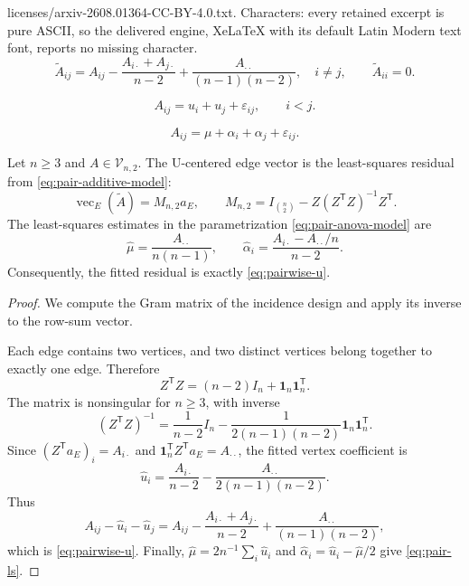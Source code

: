 \documentclass[10pt,a4paper]{amsart}
\newcommand{\cV}{\mathcal V}
\newcommand{\one}{\mathbf 1}
\begin{document}
licenses/arxiv-2608.01364-CC-BY-4.0.txt. Characters: every retained excerpt is pure ASCII, so the delivered engine, XeLaTeX with its default Latin Modern text font, reports no missing character.
\begin{equation}\label{eq:pairwise-u}
 \widetilde A_{ij}
 =A_{ij}-\frac{A_{i\cdot}+A_{j\cdot}}{n-2}
       +\frac{A_{\cdot\cdot}}{(n-1)(n-2)},
 \quad i\ne j,
 \qquad
 \widetilde A_{ii}=0.
\end{equation}

\begin{equation}\label{eq:pair-additive-model}
  A_{ij}=u_i+u_j+\varepsilon_{ij},\qquad i<j.
\end{equation}

\begin{equation}\label{eq:pair-anova-model}
  A_{ij}=\mu+\alpha_i+\alpha_j+\varepsilon_{ij}.
\end{equation}

\begin{theorem}
\label{thm:pair-anova}
Let $n\ge3$ and $A\in\cV_{n,2}$.  The U-centered edge vector is the
least-squares residual from \eqref{eq:pair-additive-model}:
\begin{equation}\label{eq:pair-projection}
  \operatorname{vec}_{E}(\widetilde A)
  =M_{n,2}a_E,
  \qquad
  M_{n,2}=I_{\binom{n}{2}}-Z(Z^\mathsf TZ)^{-1}Z^\mathsf T.
\end{equation}
The least-squares estimates in the parametrization
\eqref{eq:pair-anova-model} are
\begin{equation}\label{eq:pair-ls}
 \widehat\mu=\frac{A_{\cdot\cdot}}{n(n-1)},
 \qquad
 \widehat\alpha_i
 =\frac{A_{i\cdot}-A_{\cdot\cdot}/n}{n-2}.
\end{equation}
Consequently, the fitted residual is exactly \eqref{eq:pairwise-u}.
\end{theorem}

\begin{proof}
We compute the Gram matrix of the incidence design and apply its inverse to
the row-sum vector.

Each edge contains two vertices, and two distinct vertices belong together to
exactly one edge.  Therefore
  \begin{equation*}
 Z^\mathsf TZ=(n-2)I_n+\one_n\one_n^\mathsf T.
\end{equation*}
The matrix is nonsingular for $n\ge3$, with inverse
\begin{equation}\label{eq:ztz-inverse}
 (Z^\mathsf TZ)^{-1}
 =\frac{1}{n-2}I_n
 -\frac{1}{2(n-1)(n-2)}\one_n\one_n^\mathsf T.
\end{equation}
Since $(Z^\mathsf Ta_E)_i=A_{i\cdot}$ and
$\one_n^\mathsf TZ^\mathsf Ta_E=A_{\cdot\cdot}$, the fitted vertex coefficient is
\[
 \widehat u_i
 =\frac{A_{i\cdot}}{n-2}
  -\frac{A_{\cdot\cdot}}{2(n-1)(n-2)}.
\]
Thus
\[
 A_{ij}-\widehat u_i-\widehat u_j
 =A_{ij}-\frac{A_{i\cdot}+A_{j\cdot}}{n-2}
  +\frac{A_{\cdot\cdot}}{(n-1)(n-2)},
\]
which is \eqref{eq:pairwise-u}.  Finally,
$\widehat\mu=2n^{-1}\sum_i\widehat u_i$ and
$\widehat\alpha_i=\widehat u_i-\widehat\mu/2$ give
\eqref{eq:pair-ls}.
\end{proof}
\end{document}

